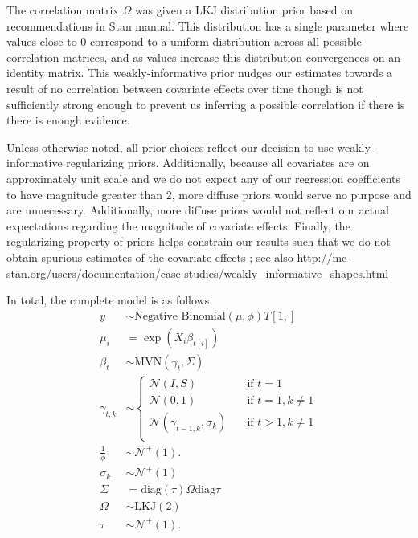 \documentclass[12pt,letterpaper]{article}
\begin{document}
The correlation matrix \(\Omega\) was given a LKJ distribution prior based on recommendations in Stan manual. This distribution has a single parameter where values close to 0 correspond to a uniform distribution across all possible correlation matrices, and as values increase this distribution convergences on an identity matrix. This weakly-informative prior nudges our estimates towards a result of no correlation between covariate effects over time though is not sufficiently strong enough to prevent us inferring a possible correlation if there is there is enough evidence.

Unless otherwise noted, all prior choices reflect our decision to use weakly-informative regularizing priors. Additionally, because all covariates are on approximately unit scale and we do not expect any of our regression coefficients to have magnitude greater than 2, more diffuse priors would serve no purpose and are unnecessary. Additionally, more diffuse priors would not reflect our actual expectations regarding the magnitude of covariate effects. Finally, the regularizing property of priors helps constrain our results such that we do not obtain spurious estimates of the covariate effects \citep{BDA3,Gelman2008}; see also \url{http://mc-stan.org/users/documentation/case-studies/weakly\_informative\_shapes.html}

In total, the complete model is as follows
\begin{equation}
  \begin{aligned}
    y &\sim \text{Negative Binomial}(\mu, \phi) T[1, ] \\
    \mu_{i} &= \exp(X_{i} \beta_{t[i]}) \\
    \beta_{t} &\sim \text{MVN}(\gamma_{t}, \Sigma) \\
    \gamma_{t, k} &\sim 
    \begin{cases}
      \mathcal{N}(I, S) & \quad \text{if } t = 1 \\
      \mathcal{N}(0, 1) & \quad \text{if } t = 1, k \neq 1 \\
      \mathcal{N}(\gamma_{t - 1, k}, \sigma_{k}) & \quad \text{if } t > 1, k \neq 1 \\
    \end{cases} \\
    \frac{1}{\phi} &\sim \mathcal{N}^{+}(1). \\
    \sigma_{k} &\sim \mathcal{N}^{+}(1) \\ 
    \Sigma &= \text{diag}(\tau) \Omega \text{diag}{\tau} \\
    \Omega &\sim \text{LKJ}(2) \\
    \tau &\sim \mathcal{N}^{+}(1). \\
  \end{aligned}
  \label{eq:complete}
\end{equation}
\end{document}
